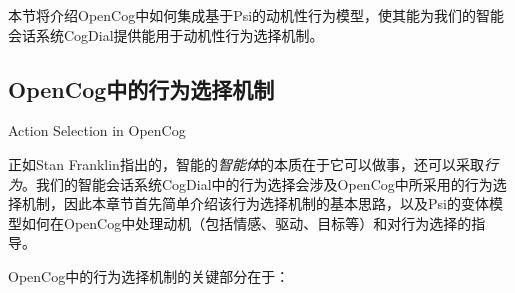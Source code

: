 本节将介绍OpenCog中如何集成基于Psi的动机性行为模型，使其能为我们的智能会话系统CogDial提供能用于动机性行为选择机制。

\subsection{OpenCog中的行为选择机制}{ Action Selection in OpenCog}

正如Stan Franklin\cite{Franklin1995}指出的，智能的{\it 智能体}的本质在于它可以做事，还可以采取{\it 行为}。我们的智能会话系统CogDial中的行为选择会涉及OpenCog中所采用的行为选择机制\cite{EGI2}，因此本章节首先简单介绍该行为选择机制的基本思路，以及Psi的变体模型如何在OpenCog中处理动机（包括情感、驱动、目标等）和对行为选择的指导。

OpenCog中的行为选择机制的关键部分在于：

